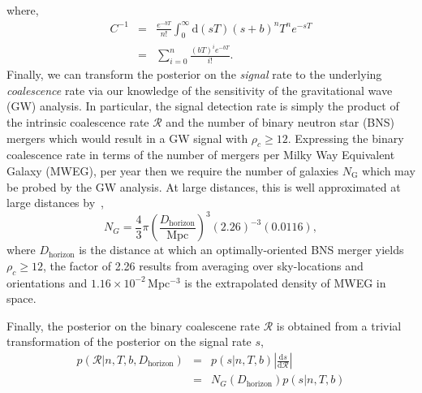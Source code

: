 \documentclass[twocolumn,nofootinbib]{revtex4-1}
\newcommand{\cbcrate}{{{\mathcal R}}}
\newcommand{\diff}{{\mathrm d}}
\def\bns#1{binary neutron star#1 (BNS#1)\gdef\bns{BNS}}
\def\gw#1{gravitational wave#1 (GW#1)\gdef\gw{GW}}
\def\mweg#1{Milky Way Equivalent Galaxy#1 (MWEG#1)\gdef\mweg{MWEG}}
\begin{document}
%
where,
\begin{eqnarray}
C^{-1} & = &\frac{e^{-bT}}{n!} \int_0^{\infty}\diff(sT)(s+b)^n T^n e^{-sT}\\
& = & \sum_{i=0}^n \frac{ (bT)^i e^{-bT}}{i!}.
\end{eqnarray}
%
Finally, we can transform the posterior on the \emph{signal} rate to the
underlying \emph{coalescence} rate via our knowledge of the sensitivity of the
\gw{} analysis.  In particular,  the signal detection rate is simply the product
of the intrinsic coalescence rate $\cbcrate$ and the number of \bns{} mergers
which would result in a \gw{} signal with $\rho_c\geq12$.   Expressing the
binary coalescence rate in terms of the number of mergers per \mweg{}, per year
then we require the number of galaxies $N_{\mathrm{G}}$ which may be probed by
the \gw{} analysis.  At large distances, this is well approximated at large
distances by~\cite{rates_paper},
%
\begin{equation}
N_G = \frac{4}{3} \pi \left( \frac{D_{\textrm{horizon}}}{\textrm{Mpc}}
\right)^3 (2.26)^{-3} (0.0116),
\end{equation}
%
where $D_{\mathrm{horizon}}$ is the distance at which an optimally-oriented
\bns{} merger yields $\rho_c\geq12$, the factor of 2.26 results from averaging
over sky-locations and orientations and $1.16\times 10^{-2}$\,Mpc$^{-3}$ is the
extrapolated density of \mweg{} in space.

Finally, the posterior on the binary coalescene rate $\cbcrate$ is obtained from
a trivial transformation of the posterior on the signal rate $s$,
%
\begin{eqnarray}
    p(\cbcrate|n,T,b,D_{\mathrm{horizon}}) & = & p(s|n,T,b) \left|\frac{\diff s}{\diff \cbcrate}\right| \\
                                           & = & N_G(D_{\mathrm{horizon}})p(s|n,T,b)
\end{eqnarray}
%
\end{document}
